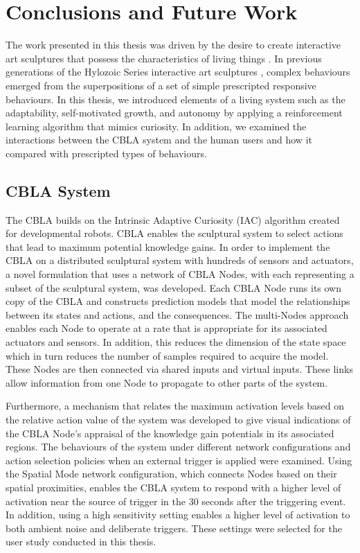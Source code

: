 \chapter{Conclusions and Future Work} \label{chap:conclusions}
 
The work presented in this thesis was driven by the desire to create interactive art sculptures that possess the characteristics of living things \cite{Gorbet2015}. In previous generations of the Hylozoic Series interactive art sculptures \cite{Beesley2012}, complex behaviours emerged from the superpositions of a set of simple prescripted responsive behaviours. In this thesis, we introduced elements of a living system such as the adaptability, self-motivated growth, and autonomy by applying a reinforcement learning algorithm that mimics curiosity. In addition, we examined the interactions between the CBLA system and the human users and how it compared with prescripted types of behaviours.
 
\section{CBLA System}
The CBLA builds on the Intrinsic Adaptive Curiosity (IAC) algorithm \cite{Oudeyer2007} created for developmental robots. CBLA enables the sculptural system to select actions that lead to maximum potential knowledge gains. In order to implement the CBLA on a distributed sculptural system with hundreds of sensors and actuators, a novel formulation that uses a network of CBLA Nodes, with each representing a subset of the sculptural system, was developed. Each CBLA Node runs its own copy of the CBLA and constructs prediction models that model the relationships between its states and actions, and the consequences. The multi-Nodes approach enables each Node to operate at a rate that is appropriate for its associated actuators and sensors. In addition, this reduces the dimension of the state space which in turn reduces the number of samples required to acquire the model. These Nodes are then connected via shared inputs and virtual inputs. These links allow information from one Node to propagate to other parts of the system. 

Furthermore, a mechanism that relates the maximum activation levels based on the relative action value of the system was developed to give visual indications of the CBLA Node's appraisal of the knowledge gain potentials in its associated regions. 
The behaviours of the system under different network configurations and action selection policies when an external trigger is applied were examined. Using the Spatial Mode network configuration, which connects Nodes based on their spatial proximities, enables the CBLA system to respond with a higher level of activation near the source of trigger in the 30 seconds after the triggering event. In addition, using a high sensitivity setting enables a higher level of activation to both ambient noise and deliberate triggers. These settings were selected for the user study conducted in this thesis.

